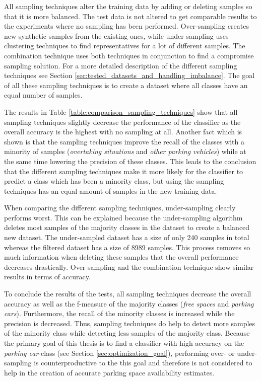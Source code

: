 All sampling techniques alter the training data by adding or deleting samples so that it is more balanced. The test data is not altered to get comparable results to the experiments where no sampling has been performed.
Over-sampling creates new synthetic samples from the existing ones, while under-sampling uses clustering techniques to find representatives for a lot of different samples. The combination technique uses both techniques in conjunction to find a compromise sampling solution. For a more detailed description of the different sampling techniques see Section \ref{sec:tested_datasets_and_handling_imbalance}. The goal of all these sampling techniques is to create a dataset where all classes have an equal number of samples. 

The results in Table \ref{table:comparison_sampling_techniques} show that all sampling techniques slightly decrease the performance of the classifier as the overall accuracy is the highest with no sampling at all. Another fact which is shown is that the sampling techniques improve the recall of the classes with a minority of samples (\emph{overtaking situations} and \emph{other parking vehicles}) while at the same time lowering the precision of these classes. This leads to the conclusion that the different sampling techniques make it more likely for the classifier to predict a class which has been a minority class, but using the sampling techniques has an equal amount of samples in the new training data.

When comparing the different sampling techniques, under-sampling clearly performs worst. This can be explained because the under-sampling algorithm deletes most samples of the majority classes in the dataset to create a balanced new dataset. The under-sampled dataset has a size of only 240 samples in total whereas the filtered dataset has a size of 8989 samples. This process removes so much information when deleting these samples that the overall performance decreases drastically. Over-sampling and the combination technique show similar results in terms of accuracy.

To conclude the results of the tests, all sampling techniques decrease the overall accuracy as well as the f-measure of the majority classes (\emph{free spaces} and \emph{parking cars}). Furthermore, the recall of the minority classes is increased while the precision is decreased. Thus, sampling techniques do help to detect more samples of the minority class while detecting less samples of the majority class. Because the primary goal of this thesis is to find a classifier with high accuracy on the \emph{parking car}-class (see Section \ref{sec:optimization_goal}), performing over- or under-sampling is counterproductive to the this goal and therefore is not considered to help in the creation of accurate parking space availability estimates.



